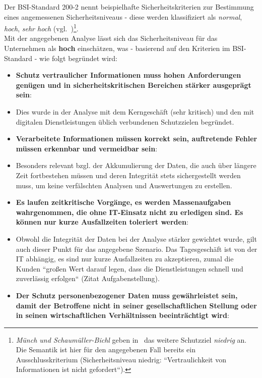Der BSI-Standard 200-2 nennt beispielhafte Sicherheitskriterien zur Bestimmung eines angemessenen Sicherheitsniveaus - diese werden klassifiziert als \textit{normal}, \textit{hoch}, \textit{sehr hoch} (vgl.~\cite[24f.]{BSI200-2})\footnote{
\textit{Münch und Schaumüller-Bichl} geben in~\cite[37]{ITS2} das weitere Schutzziel \textit{niedrig} an. Die Semantik ist hier für den angegebenen Fall bereits ein Ausschlusskriterium (Sicherheitsniveau niedrig: ``Vertraulichkeit von Informationen ist nicht gefordert``).
}.\\

Mit der angegebenen Analyse lässt sich das Sicherheitsniveau für das Unternehmen als \textbf{hoch} einschätzen, was - basierend auf den Kriterien im BSI-Standard - wie folgt begründet wird:

\begin{itemize}
\itemsep0.5em
\item \textbf{Schutz vertraulicher Informationen muss hohen Anforderungen genügen und in sicherheitskritischen Bereichen stärker ausgeprägt sein}:
\item[] Dies wurde in der Analyse mit dem Kerngeschäft (sehr kritisch) und den mit digitalen Dienstleistungen üblich verbundenen Schutzzielen begründet.
\item \textbf{Verarbeitete Informationen müssen korrekt sein, auftretende Fehler müssen erkennbar und vermeidbar sein}:
\item[] Besonders relevant bzgl. der Akkumulierung der Daten, die auch über längere Zeit fortbestehen müssen und deren Integrität stets sichergestellt werden muss, um keine verfälschten Analysen und Auswertungen zu erstellen.
\item \textbf{Es laufen zeitkritische Vorgänge, es werden Massenaufgaben wahrgenommen, die ohne IT-Einsatz nicht zu erledigen sind. Es können nur kurze Ausfallzeiten toleriert werden}:
\item[] Obwohl die Integrität der Daten bei der Analyse stärker gewichtet wurde, gilt auch dieser Punkt für das angegebene Szenario. Das Tagesgeschäft ist von der IT abhängig, es sind nur kurze Ausfallzeiten zu akzeptieren, zumal die Kunden ``großen Wert darauf legen, dass die Dienstleistungen schnell und zuverlässig erfolgen`` (Zitat Aufgabenstellung).
\item \textbf{Der Schutz personenbezogener Daten muss gewährleistet sein, damit der Betroffene nicht in seiner gesellschaftlichen Stellung oder in seinen wirtschaftlichen Verhältnissen beeinträchtigt wird}:

\end{itemize}
